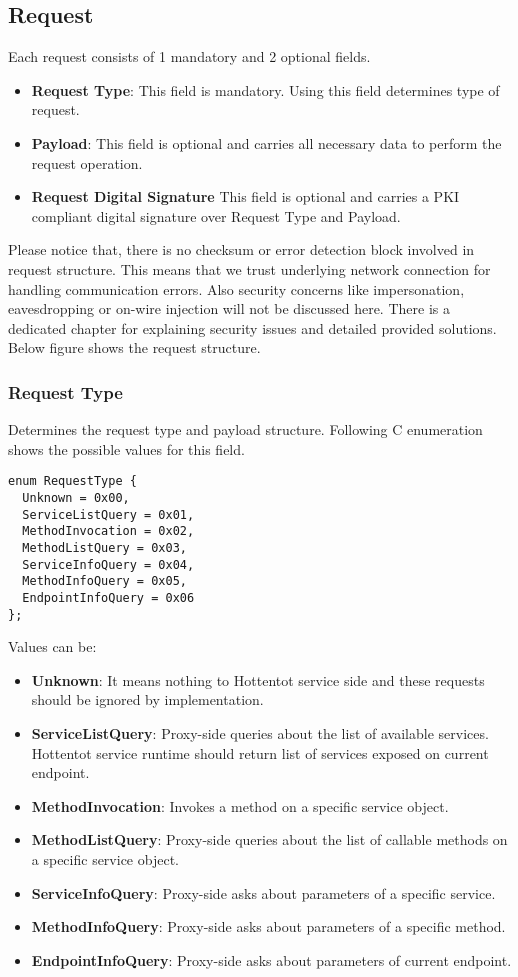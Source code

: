 \documentclass[10pt,a4paper]{article}
\begin{document}
\subsection{Request}
Each request consists of 1 mandatory and 2 optional fields.
\begin{itemize}
  \item \textbf{Request Type}: This field is mandatory. Using this field determines type of request.
  \item \textbf{Payload}: This field is optional and carries all necessary data to perform the request operation.
  \item \textbf{Request Digital Signature} This field is optional and carries a PKI compliant digital signature over Request Type and Payload.
\end{itemize} 
Please notice that, there is no checksum or error detection block involved in request structure. This means that we trust underlying network connection for handling communication errors. Also security concerns like impersonation, eavesdropping or on-wire injection will not be discussed here. There is a dedicated chapter for explaining security issues and detailed provided solutions. Below figure shows the request structure.

\subsubsection{Request Type}
Determines the request type and payload structure. Following C enumeration shows the possible values for this field.

\begin{verbatim}
enum RequestType { 
  Unknown = 0x00, 
  ServiceListQuery = 0x01, 
  MethodInvocation = 0x02,
  MethodListQuery = 0x03,
  ServiceInfoQuery = 0x04,
  MethodInfoQuery = 0x05,
  EndpointInfoQuery = 0x06
};
\end{verbatim}

\noindent
Values can be:
\begin{itemize}
  \item \textbf{Unknown}: It means nothing to Hottentot service side and these requests should be ignored by implementation.
  \item \textbf{ServiceListQuery}: Proxy-side queries about the list of available services. Hottentot service runtime should return list of services exposed on current endpoint.
  \item \textbf{MethodInvocation}: Invokes a method on a specific service object.
  \item \textbf{MethodListQuery}: Proxy-side queries about the list of callable methods on a specific service object.
  \item \textbf{ServiceInfoQuery}: Proxy-side asks about parameters of a specific service.
  \item \textbf{MethodInfoQuery}: Proxy-side asks about parameters of a specific method.
  \item \textbf{EndpointInfoQuery}: Proxy-side asks about parameters of current endpoint.
\end{itemize}
\end{document}
